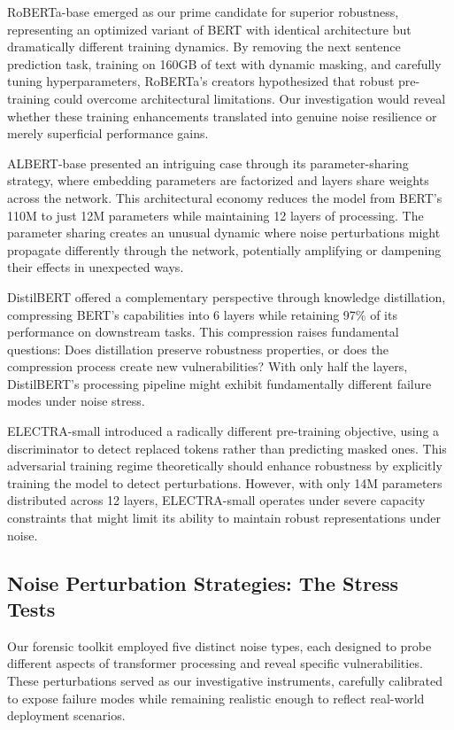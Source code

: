 RoBERTa-base \cite{liu2019roberta} emerged as our prime candidate for superior robustness, representing an optimized variant of BERT with identical architecture but dramatically different training dynamics. By removing the next sentence prediction task, training on 160GB of text with dynamic masking, and carefully tuning hyperparameters, RoBERTa's creators hypothesized that robust pre-training could overcome architectural limitations. Our investigation would reveal whether these training enhancements translated into genuine noise resilience or merely superficial performance gains.

ALBERT-base \cite{lan2020albert} presented an intriguing case through its parameter-sharing strategy, where embedding parameters are factorized and layers share weights across the network. This architectural economy reduces the model from BERT's 110M to just 12M parameters while maintaining 12 layers of processing. The parameter sharing creates an unusual dynamic where noise perturbations might propagate differently through the network, potentially amplifying or dampening their effects in unexpected ways.

DistilBERT \cite{sanh2019distilbert} offered a complementary perspective through knowledge distillation, compressing BERT's capabilities into 6 layers while retaining 97\% of its performance on downstream tasks. This compression raises fundamental questions: Does distillation preserve robustness properties, or does the compression process create new vulnerabilities? With only half the layers, DistilBERT's processing pipeline might exhibit fundamentally different failure modes under noise stress.

ELECTRA-small \cite{clark2020electra} introduced a radically different pre-training objective, using a discriminator to detect replaced tokens rather than predicting masked ones. This adversarial training regime theoretically should enhance robustness by explicitly training the model to detect perturbations. However, with only 14M parameters distributed across 12 layers, ELECTRA-small operates under severe capacity constraints that might limit its ability to maintain robust representations under noise.

\subsection{Noise Perturbation Strategies: The Stress Tests}

Our forensic toolkit employed five distinct noise types, each designed to probe different aspects of transformer processing and reveal specific vulnerabilities. These perturbations served as our investigative instruments, carefully calibrated to expose failure modes while remaining realistic enough to reflect real-world deployment scenarios.

